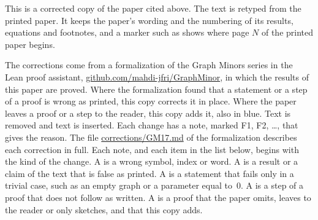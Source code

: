 
This is a corrected copy of the paper cited above. The text is retyped from the printed paper.
It keeps the paper's wording and the numbering of its results, equations and footnotes, and a
marker such as  shows where page $N$ of the printed paper begins.

The corrections come from a formalization of the Graph Minors series in the Lean proof
assistant, \href{https://github.com/mahdi-jfri/GraphMinor}{github.com/mahdi-jfri/GraphMinor},
in which the results of this paper are proved. Where the formalization found that a statement
or a step of a proof is wrong as printed, this copy corrects it in place. Where the paper leaves a proof or a step to the reader, this
copy adds it, also in blue. Text  is removed and text  is inserted. Each change has a note, marked
\textcolor{fixcolor}{\sffamily F1}, \textcolor{fixcolor}{\sffamily F2}, \dots, that gives the
reason. The file
\href{https://github.com/mahdi-jfri/GraphMinor/blob/main/corrections/GM17.md}{corrections/GM17.md}
of the formalization describes each correction in full. Each note, and each item in the list below, begins with the kind of the change. A  is a wrong symbol, index or word. A  is a result or a claim of the text that is false as printed. A  is a statement that fails only in a trivial case, such as an empty graph or a parameter equal to~$0$. A  is a step of a proof that does not follow as written. A  is a proof that the paper omits, leaves to the reader or only sketches, and that this copy adds.

